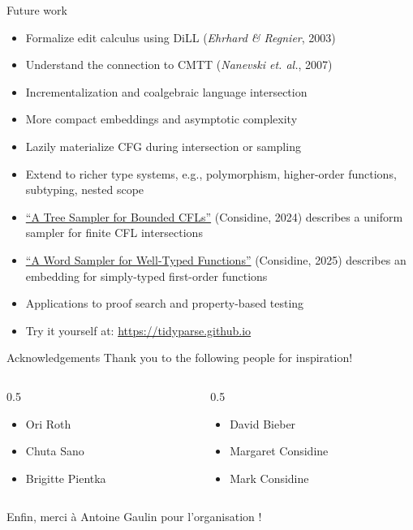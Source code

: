 \documentclass{beamer}
\begin{document}
\begin{frame}{Future work}
  \begin{itemize}
    \item Formalize edit calculus using DiLL (\textit{Ehrhard \& Regnier}, 2003)
    \item Understand the connection to CMTT (\textit{Nanevski et. al.}, 2007)
    \item Incrementalization and coalgebraic language intersection
    \item More compact embeddings and asymptotic complexity
    \item Lazily materialize CFG during intersection or sampling
    \item Extend to richer type systems, e.g., polymorphism, higher-order functions, subtyping, nested scope
    \item \href{https://arxiv.org/pdf/2408.01849}{``A Tree Sampler for Bounded CFLs''} (Considine, 2024) describes a uniform sampler for finite CFL intersections
    \item \href{https://arxiv.org/pdf/2512.01036}{``A Word Sampler for Well-Typed Functions''} (Considine, 2025) describes an embedding for simply-typed first-order functions
    \item Applications to proof search and property-based testing
    \item Try it yourself at: \href{https://tidyparse.github.io}{https://tidyparse.github.io}
  \end{itemize}
\end{frame}

\begin{frame}{Acknowledgements}
  \Large{Thank you to the following people for inspiration!}\vspace{0.5cm}
  \begin{columns}
  \begin{column}{0.5\textwidth}
  \begin{itemize}
    \item Ori Roth
    \item Chuta Sano
    \item Brigitte Pientka
  \end{itemize}
  \end{column}
  \begin{column}{0.5\textwidth}
    \begin{itemize}
      \item David Bieber
      \item Margaret Considine
      \item Mark Considine
    \end{itemize}
  \end{column}
  \end{columns}\vspace{1cm}
  \Large{Enfin, merci \`a Antoine Gaulin pour l'organisation !}\vspace{0.5cm}
\end{frame}
\end{document}
